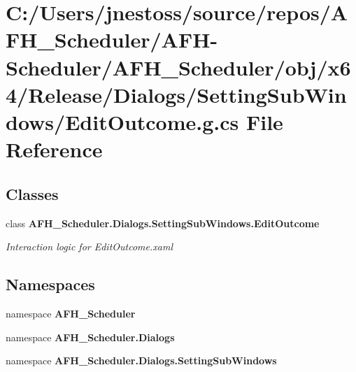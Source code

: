 \section{C\+:/\+Users/jnestoss/source/repos/\+A\+F\+H\+\_\+\+Scheduler/\+A\+F\+H-\/\+Scheduler/\+A\+F\+H\+\_\+\+Scheduler/obj/x64/\+Release/\+Dialogs/\+Setting\+Sub\+Windows/\+Edit\+Outcome.g.\+cs File Reference}
\label{x64_2_release_2_dialogs_2_setting_sub_windows_2_edit_outcome_8g_8cs}
\subsection*{Classes}
\begin{DoxyCompactItemize}
\item 
class \textbf{ A\+F\+H\+\_\+\+Scheduler.\+Dialogs.\+Setting\+Sub\+Windows.\+Edit\+Outcome}
\begin{DoxyCompactList}\small\item\em Interaction logic for Edit\+Outcome.\+xaml \end{DoxyCompactList}\end{DoxyCompactItemize}
\subsection*{Namespaces}
\begin{DoxyCompactItemize}
\item 
namespace \textbf{ A\+F\+H\+\_\+\+Scheduler}
\item 
namespace \textbf{ A\+F\+H\+\_\+\+Scheduler.\+Dialogs}
\item 
namespace \textbf{ A\+F\+H\+\_\+\+Scheduler.\+Dialogs.\+Setting\+Sub\+Windows}
\end{DoxyCompactItemize}
